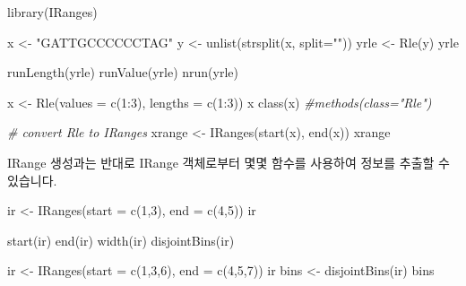 \documentclass[
]{book}
\newenvironment{Shaded}{\begin{snugshade}}{\end{snugshade}}
\newcommand{\AttributeTok}[1]{\textcolor[rgb]{0.77,0.63,0.00}{#1}}
\newcommand{\CommentTok}[1]{\textcolor[rgb]{0.56,0.35,0.01}{\textit{#1}}}
\newcommand{\DecValTok}[1]{\textcolor[rgb]{0.00,0.00,0.81}{#1}}
\newcommand{\FunctionTok}[1]{\textcolor[rgb]{0.00,0.00,0.00}{#1}}
\newcommand{\NormalTok}[1]{#1}
\newcommand{\OtherTok}[1]{\textcolor[rgb]{0.56,0.35,0.01}{#1}}
\newcommand{\SpecialCharTok}[1]{\textcolor[rgb]{0.00,0.00,0.00}{#1}}
\newcommand{\StringTok}[1]{\textcolor[rgb]{0.31,0.60,0.02}{#1}}
\begin{document}
\begin{Shaded}
\begin{Highlighting}[]
\FunctionTok{library}\NormalTok{(IRanges)}

\NormalTok{x }\OtherTok{\textless{}{-}} \StringTok{"GATTGCCCCCCTAG"}
\NormalTok{y }\OtherTok{\textless{}{-}} \FunctionTok{unlist}\NormalTok{(}\FunctionTok{strsplit}\NormalTok{(x, }\AttributeTok{split=}\StringTok{""}\NormalTok{))}
\NormalTok{yrle }\OtherTok{\textless{}{-}} \FunctionTok{Rle}\NormalTok{(y)}
\NormalTok{yrle}

\FunctionTok{runLength}\NormalTok{(yrle)}
\FunctionTok{runValue}\NormalTok{(yrle)}
\FunctionTok{nrun}\NormalTok{(yrle)}

\NormalTok{x }\OtherTok{\textless{}{-}} \FunctionTok{Rle}\NormalTok{(}\AttributeTok{values =} \FunctionTok{c}\NormalTok{(}\DecValTok{1}\SpecialCharTok{:}\DecValTok{3}\NormalTok{), }\AttributeTok{lengths =} \FunctionTok{c}\NormalTok{(}\DecValTok{1}\SpecialCharTok{:}\DecValTok{3}\NormalTok{))}
\NormalTok{x}
\FunctionTok{class}\NormalTok{(x)}
\CommentTok{\#methods(class="Rle")}

\CommentTok{\# convert Rle to IRanges}
\NormalTok{xrange }\OtherTok{\textless{}{-}} \FunctionTok{IRanges}\NormalTok{(}\FunctionTok{start}\NormalTok{(x), }\FunctionTok{end}\NormalTok{(x))}
\NormalTok{xrange}
\end{Highlighting}
\end{Shaded}

IRange 생성과는 반대로 IRange 객체로부터 몇몇 함수를 사용하여 정보를 추출할 수 있습니다.

\begin{Shaded}
\begin{Highlighting}[]
\NormalTok{ir }\OtherTok{\textless{}{-}} \FunctionTok{IRanges}\NormalTok{(}\AttributeTok{start =} \FunctionTok{c}\NormalTok{(}\DecValTok{1}\NormalTok{,}\DecValTok{3}\NormalTok{), }\AttributeTok{end =} \FunctionTok{c}\NormalTok{(}\DecValTok{4}\NormalTok{,}\DecValTok{5}\NormalTok{))}
\NormalTok{ir}

\FunctionTok{start}\NormalTok{(ir)}
\FunctionTok{end}\NormalTok{(ir)}
\FunctionTok{width}\NormalTok{(ir)}
\FunctionTok{disjointBins}\NormalTok{(ir)}

\NormalTok{ir }\OtherTok{\textless{}{-}} \FunctionTok{IRanges}\NormalTok{(}\AttributeTok{start =} \FunctionTok{c}\NormalTok{(}\DecValTok{1}\NormalTok{,}\DecValTok{3}\NormalTok{,}\DecValTok{6}\NormalTok{), }\AttributeTok{end =} \FunctionTok{c}\NormalTok{(}\DecValTok{4}\NormalTok{,}\DecValTok{5}\NormalTok{,}\DecValTok{7}\NormalTok{))}
\NormalTok{ir}
\NormalTok{bins }\OtherTok{\textless{}{-}} \FunctionTok{disjointBins}\NormalTok{(ir)}
\NormalTok{bins}
\end{Highlighting}
\end{Shaded}
\end{document}
